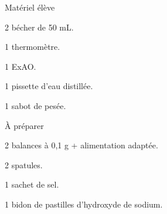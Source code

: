 
\begin{boiteMateriel}{Matériel élève}
  \effectifSeconde
  
  \begin{protocole}
    \item 2 bécher de 50 mL.
    \item 1 thermomètre.
    \item 1 ExAO.
    \item 1 pissette d'eau distillée.
    \item 1 sabot de pesée.
  \end{protocole}
\end{boiteMateriel}


\begin{boiteMateriel}{À préparer}
  \begin{protocole}
    \item 2 balances à 0,1 g + alimentation adaptée.
    \item 2 spatules.
    \item 1 sachet de sel.
    \item 1 bidon de pastilles d'hydroxyde de sodium.
  \end{protocole}
\end{boiteMateriel}